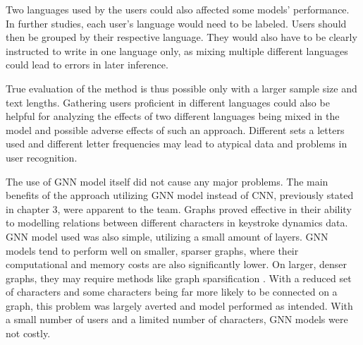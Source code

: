 Two languages used by the users could also affected some models' performance. In further studies, each user's language would need to be labeled. Users should then be grouped by their respective language. They would also have to be clearly instructed to write in one language only, as mixing multiple different languages could lead to errors in later inference. 

True evaluation of the method is thus possible only with a larger sample size and text lengths. Gathering users proficient in different languages could also be helpful for analyzing the effects of two different languages being mixed in the model and possible adverse effects of such an approach. Different sets a letters used and different letter frequencies may lead to atypical data and problems in user recognition.

The use of GNN model itself did not cause any major problems. The main benefits of the approach utilizing GNN model instead of CNN, previously stated in chapter 3, were apparent to the team. Graphs proved effective in their ability to modelling relations between different characters in keystroke dynamics data. GNN model used was also simple, utilizing a small amount of layers. GNN models tend to perform well on smaller, sparser graphs, where their computational and memory costs are also significantly lower. On larger, denser graphs, they may require methods like graph sparsification \cite{zhang2024graphsparsificationmixturegraphs}. With a reduced set of characters and some characters being far more likely to be connected on a graph, this problem was largely averted and model performed as intended.  With a small number of users and a limited number of characters, GNN models were not costly. 
